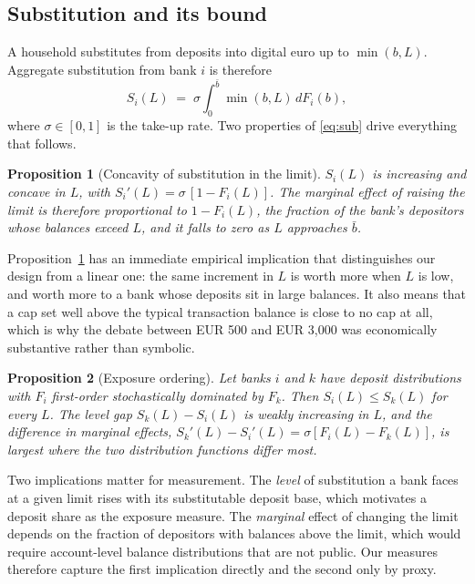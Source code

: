 \documentclass[11pt]{article}
\theoremstyle{plain}\newtheorem{proposition}{Proposition}
\begin{document}
\subsection{Substitution and its bound}

A household substitutes from deposits into digital euro up to $\min(b, L)$. Aggregate substitution from bank $i$ is therefore
\begin{equation}\label{eq:sub}
S_i(L) \;=\; \sigma \int_0^{\bar b} \min(b, L)\, dF_i(b),
\end{equation}
where $\sigma \in [0,1]$ is the take-up rate. Two properties of \eqref{eq:sub} drive everything that follows.

\begin{proposition}[Concavity of substitution in the limit]\label{prop:conc}
$S_i(L)$ is increasing and concave in $L$, with $S_i'(L) = \sigma\,[1 - F_i(L)]$. The marginal effect of raising the limit is therefore proportional to $1-F_i(L)$, the fraction of the bank's depositors whose balances exceed $L$, and it falls to zero as $L$ approaches $\bar b$.
\end{proposition}

Proposition~\ref{prop:conc} has an immediate empirical implication that distinguishes our design from a linear one: the same increment in $L$ is worth more when $L$ is low, and worth more to a bank whose deposits sit in large balances. It also means that a cap set well above the typical transaction balance is close to no cap at all, which is why the debate between EUR 500 and EUR 3,000 was economically substantive rather than symbolic.

\begin{proposition}[Exposure ordering]\label{prop:order}
Let banks $i$ and $k$ have deposit distributions with $F_i$ first-order stochastically dominated by $F_k$. Then $S_i(L) \le S_k(L)$ for every $L$. The level gap $S_k(L)-S_i(L)$ is weakly increasing in $L$, and the difference in marginal effects, $S_k'(L)-S_i'(L)=\sigma[F_i(L)-F_k(L)]$, is largest where the two distribution functions differ most.
\end{proposition}

Two implications matter for measurement. The \emph{level} of substitution a bank faces at a given limit rises with its substitutable deposit base, which motivates a deposit share as the exposure measure. The \emph{marginal} effect of changing the limit depends on the fraction of depositors with balances above the limit, which would require account-level balance distributions that are not public. Our measures therefore capture the first implication directly and the second only by proxy.
\end{document}
